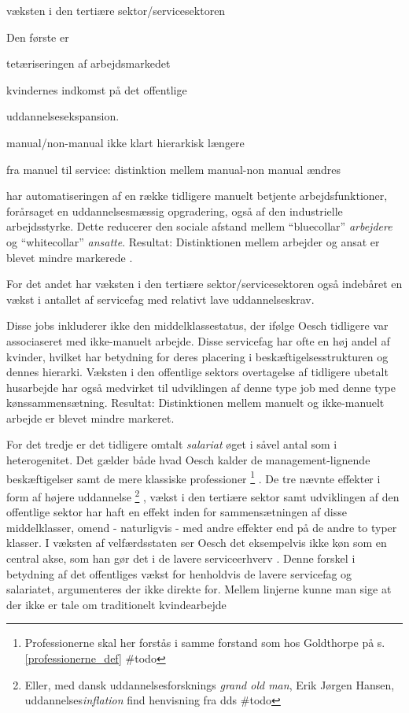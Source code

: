 væksten i den tertiære sektor/servicesektoren

Den første er 

tetæriseringen af arbejdsmarkedet

kvindernes indkomst på det offentlige

uddannelsesekspansion. 


manual/non-manual ikke klart hierarkisk længere

fra manuel til service: distinktion mellem manual-non manual ændres 



har automatiseringen af en række tidligere manuelt betjente arbejdsfunktioner, forårsaget en uddannelsesmæssig opgradering, også af den industrielle arbejdsstyrke. Dette reducerer den sociale afstand mellem “bluecollar” \emph{arbejdere} og “whitecollar” \emph{ansatte}. Resultat: Distinktionen mellem arbejder og ansat er blevet mindre markerede \parencite[2f]{Oesch2006a}. 

For det andet har væksten i den tertiære sektor/servicesektoren også indebåret en vækst i antallet af servicefag med relativt lave uddannelseskrav. 

Disse jobs inkluderer ikke den middelklassestatus, der ifølge Oesch tidligere var associaseret med ikke-manuelt arbejde. Disse servicefag har ofte en høj andel af kvinder, hvilket har betydning for deres placering i beskæftigelsesstrukturen og dennes hierarki. Væksten i den offentlige sektors overtagelse af tidligere ubetalt husarbejde har også medvirket til udviklingen af denne  type job med denne type kønssammensætning. Resultat: Distinktionen mellem manuelt og ikke-manuelt arbejde er blevet mindre markeret. 

For det tredje er det tidligere omtalt \emph{salariat} øget i såvel antal som i heterogenitet. Det gælder både hvad Oesch kalder de management-lignende beskæftigelser samt de mere klassiske professioner%
%
\footnote{Professionerne skal her forstås i samme forstand som hos Goldthorpe på s. \ref{professionerne_def} \#todo}%
%
. De tre nævnte effekter i form af højere uddannelse%
%
\footnote{Eller,  med dansk uddannelsesforsknings \emph{grand old man}, Erik Jørgen Hansen, uddannelses\emph{inflation} find henvisning fra dds \#todo}%
%
, vækst i den tertiære sektor samt udviklingen af den offentlige sektor har haft en effekt inden for sammensætningen af disse middelklasser, omend - naturligvis - med andre effekter end på de andre to typer klasser. I væksten af velfærdsstaten ser Oesch det eksempelvis ikke køn som en central akse, som han gør det i de lavere serviceerhverv \parencite[2f]{Oesch2006a}. 
Denne forskel i betydning af det offentliges vækst for henholdvis de lavere servicefag og salariatet, argumenteres der ikke direkte for. Mellem linjerne kunne man sige at der ikke er tale om traditionelt kvindearbejde 

